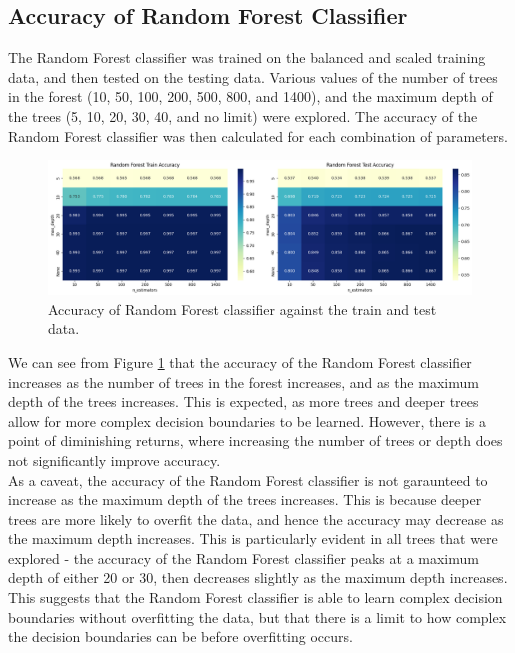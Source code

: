 \documentclass[12pt]{article}
\begin{document}
\vspace{20pt}

\subsection{Accuracy of Random Forest Classifier}
\noindent
The Random Forest classifier was trained on the balanced and scaled training data, and then tested on the testing data. Various values of the number of trees in the forest (10, 50, 100, 200, 500, 800, and 1400), and the maximum depth of the trees (5, 10, 20, 30, 40, and no limit) were explored. The accuracy of the Random Forest classifier was then calculated for each combination of parameters.

\begin{figure}[H]
\centering
\includegraphics[width=1.0\textwidth]{figures/rf_accuracy.png}
\caption{Accuracy of Random Forest classifier against the train and test data.}
\label{fig:rf_accuracy}
\end{figure}

We can see from Figure \ref{fig:rf_accuracy} that the accuracy of the Random Forest classifier increases as the number of trees in the forest increases, and as the maximum depth of the trees increases. This is expected, as more trees and deeper trees allow for more complex decision boundaries to be learned. However, there is a point of diminishing returns, where increasing the number of trees or depth does not significantly improve accuracy.
\\
As a caveat, the accuracy of the Random Forest classifier is not garaunteed to increase as the maximum depth of the trees increases. This is because deeper trees are more likely to overfit the data, and hence the accuracy may decrease as the maximum depth increases. This is particularly evident in all trees that were explored - the accuracy of the Random Forest classifier peaks at a maximum depth of either 20 or 30, then decreases slightly as the maximum depth increases. This suggests that the Random Forest classifier is able to learn complex decision boundaries without overfitting the data, but that there is a limit to how complex the decision boundaries can be before overfitting occurs.
\end{document}
